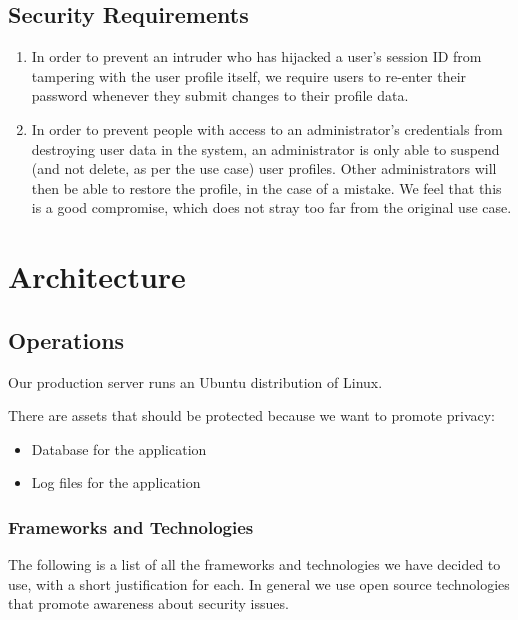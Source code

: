 \documentclass[a4paper]{article}
\begin{document}
\subsection{Security Requirements}
\begin{enumerate}
\item In order to prevent an intruder who has hijacked a user's session ID from tampering with the user profile itself, we require users to re-enter their password whenever they submit changes to their profile data.
\item In order to prevent people with access to an administrator's credentials from destroying user data in the system, an administrator is only able to suspend (and not delete, as per the use case) user profiles. Other administrators will then be able to restore the profile, in the case of a mistake. We feel that this is a good compromise, which does not stray too far from the original use case.
\end{enumerate}

\section{Architecture}\label{sec:architecture}


\subsection{Operations}
Our production server runs an Ubuntu distribution of Linux.

There are assets that should be protected because we want to promote privacy:
\begin{itemize}
\item Database for the application
\item Log files for the application
\end{itemize}

\subsubsection{Frameworks and Technologies}
The following is a list of all the frameworks and technologies we have decided to use, with a short justification for each. In general we use open source technologies that promote awareness about security issues.
\end{document}
